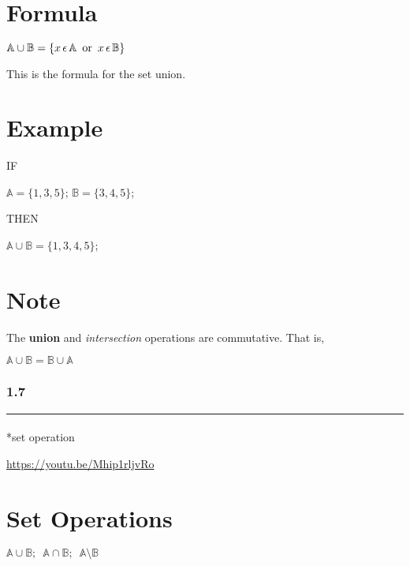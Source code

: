 \documentclass[
  letterpaper,
  DIV=11,
  numbers=noendperiod]{scrreprt}
\makeatletter
\let\oldparagraph\paragraph
\renewcommand{\paragraph}{
    \@ifstar
      \xxxParagraphStar
      \xxxParagraphNoStar
  }
\newcommand{\xxxParagraphStar}[1]{\oldparagraph*{#1}\mbox{}}
\newcommand{\xxxParagraphNoStar}[1]{\oldparagraph{#1}\mbox{}}
\makeatother
\begin{document}
\section{Formula}

\(\mathbb{A} \cup \mathbb{B} = \{ x \thinspace \epsilon \thinspace \mathbb{A} \enspace\text{or}\enspace x \thinspace \epsilon \thinspace \mathbb{B} \}\)

This is the formula for the set union.

\section{Example}

IF

\(\mathbb{A} = \{ 1,3,5 \}\); \(\mathbb{B} = \{ 3,4,5 \}\);

THEN

\(\mathbb{A} \cup \mathbb{B} = \{ 1,3,4,5 \}\);

\section{Note}

The {\textbf{union}} and \emph{intersection} operations are commutative.
That is,

\(\mathbb{A} \cup \mathbb{B} = \mathbb{B} \cup \mathbb{A}\)

\subsubsection*{1.7}\label{section-10}

\begin{center}\rule{0.5\linewidth}{0.5pt}\end{center}

\paragraph*{set operation}\label{set-operation}

\url{https://youtu.be/Mhip1rljvRo}

\section{Set Operations}

\(\mathbb{A} \cup \mathbb{B}; \enspace \mathbb{A} \cap \mathbb{B}; \enspace \mathbb{A} \setminus \mathbb{B}\)
\end{document}
